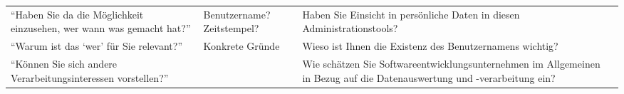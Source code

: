 \begin{table*}
{\begin{tabularx}{\linewidth}{XXXX}
        \enquote{Haben Sie da die Möglichkeit einzusehen, wer wann was gemacht hat?}                                        & Benutzername? Zeitstempel?                                                            & Haben Sie Einsicht in persönliche Daten in diesen Administrationstools?                                                       &                                                                                               \\
        \enquote{Warum ist das \enquote{wer} für Sie relevant?}                                                             & Konkrete Gründe                                                                       & Wieso ist Ihnen die Existenz des Benutzernamens wichtig?                                                                      &                                                                                               \\
        \enquote{Können Sie sich andere Verarbeitungsinteressen vorstellen?}                                                &                                                                                       & Wie schätzen Sie Softwareentwicklungsunternehmen im Allgemeinen in Bezug auf die Datenauswertung und -verarbeitung ein?       &                                                                                               \\
      \bottomrule
    \end{tabularx}
    }
  \end{table*} 
